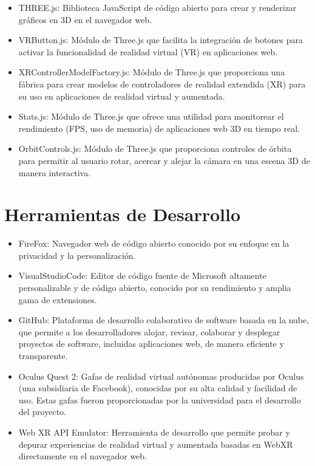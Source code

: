 \documentclass[a4paper, 12pt]{book}
\begin{document}
\begin{itemize}
  \item THREE.js: Biblioteca JavaScript de código abierto para crear y renderizar gráficos en 3D en el navegador web.
  
  \item VRButton.js: Módulo de Three.js que facilita la integración de botones para activar la funcionalidad de realidad virtual (VR) en aplicaciones web.
  
  \item XRControllerModelFactory.js: Módulo de Three.js que proporciona una fábrica para crear modelos de controladores de realidad extendida (XR) para 
  su uso en aplicaciones de realidad virtual y aumentada.

  \item Stats.js: Módulo de Three.js que ofrece una utilidad para monitorear el rendimiento (FPS, uso de memoria) de aplicaciones web 3D en tiempo real.
  
  \item OrbitControls.js: Módulo de Three.js que proporciona controles de órbita para permitir al usuario rotar, acercar y alejar la cámara en una escena 3D de manera interactiva.
  
\end{itemize}


\section{Herramientas de Desarrollo} 
\label{sec:herramientas}

\begin{itemize}
  \item FireFox: Navegador web de código abierto conocido por su enfoque en la privacidad y la personalización.
  
  \item VisualStudioCode: Editor de código fuente de Microsoft altamente personalizable y de código abierto, conocido 
  por su rendimiento y amplia gama de extensiones.
  
  \item GitHub: Plataforma de desarrollo colaborativo de software basada en la nube, que permite a los desarrolladores alojar, revisar, 
  colaborar y desplegar proyectos de software, incluidas aplicaciones web, de manera eficiente y transparente.

  \item Oculus Quest 2: Gafas de realidad virtual autónomas producidas por Oculus (una subsidiaria de Facebook), conocidas 
  por su alta calidad y facilidad de uso. Estas gafas fueron proporcionadas por la universidad para el desarrollo del proyecto.
  
  \item Web XR API Emulator: Herramienta de desarrollo que permite probar y depurar experiencias de realidad virtual y aumentada 
  basadas en WebXR directamente en el navegador web. 
  
\end{itemize}
\end{document}

